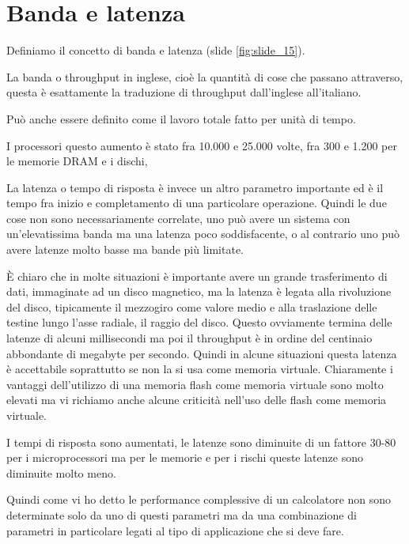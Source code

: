 \section{Banda e latenza}

Definiamo il concetto di banda e latenza (slide \ref{fig:slide_15}).

La banda o throughput in inglese, cioè la quantità di cose che passano attraverso, questa è esattamente la traduzione di throughput dall'inglese all'italiano.

Può anche essere definito come il lavoro totale fatto per unità di tempo.

I processori questo aumento è stato fra 10.000 e 25.000 volte, fra 300 e 1.200 per le memorie DRAM e i dischi, 

La latenza o tempo di risposta è invece un altro parametro importante ed è il tempo fra inizio e completamento di una particolare operazione.
Quindi le due cose non sono necessariamente correlate, uno può avere un sistema con un'elevatissima banda ma una latenza poco soddisfacente, o al contrario uno può avere latenze molto basse ma bande più limitate.

È chiaro che in molte situazioni è importante avere un grande trasferimento di dati, immaginate ad un disco magnetico, ma la latenza è legata alla rivoluzione del disco, tipicamente il mezzogiro come valore medio e alla traslazione delle testine lungo l'asse radiale, il raggio del disco.
Questo ovviamente termina delle latenze di alcuni millisecondi ma poi il throughput è in ordine del centinaio abbondante di megabyte per secondo.
Quindi in alcune situazioni questa latenza è accettabile soprattutto se non la si usa come memoria virtuale.
Chiaramente i vantaggi dell'utilizzo di una memoria flash come memoria virtuale sono molto elevati ma vi richiamo anche alcune criticità nell'uso delle flash come memoria virtuale.

I tempi di risposta sono aumentati, le latenze sono diminuite di un fattore 30-80 per i microprocessori ma per le memorie e per i rischi queste latenze sono diminuite molto meno.

Quindi come vi ho detto le performance complessive di un calcolatore non sono determinate solo da uno di questi parametri ma da una combinazione di parametri in particolare legati al tipo di applicazione che si deve fare.

